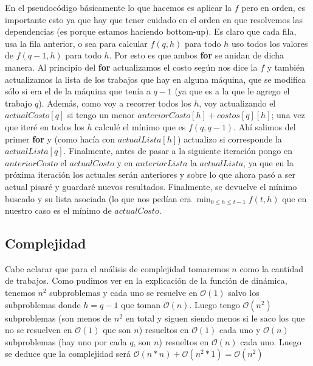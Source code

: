 \documentclass[A4paper,oneside,fleqn,11pt]{article}
\theoremstyle{definition}
\begin{document}
En el pseudocódigo básicamente lo que hacemos es aplicar la $f$ pero en orden, es importante esto ya que hay que tener cuidado en el orden en que resolvemos las dependencias (es porque estamos haciendo bottom-up). Es claro que cada fila, usa la fila anterior, o sea para calcular $f(q,h)$ para todo $h$ uso todos los valores de $f(q-1,h)$ para todo $h$. Por esto es que ambos \textbf{for} se anidan de dicha manera. Al principio del \textbf{for} actualizamos el costo según nos dice la $f$ y también actualizamos la lista de los trabajos que hay en alguna máquina, que se modifica sólo si era el de la máquina que tenía a $q-1$ (ya que es a la que le agrego el trabajo $q$). Además, como voy a recorrer todos los $h$, voy actualizando el $actualCosto[q]$ si tengo un menor $anteriorCosto[h]+costos[q][h]$; una vez que iteré en todos los $h$ calculé el mínimo que es $f(q,q-1)$. Ahí salimos del primer \textbf{for} y (como hacía con $actualLista[h]$) actualizo si corresponde la $actualLista[q]$. Finalmente, antes de pasar a la siguiente iteración pongo en $anteriorCosto$ el $actualCosto$ y en $ anteriorLista$ la $actualLista$, ya que en la próxima iteración los actuales serán anteriores y sobre lo que ahora pasó a ser actual pisaré y guardaré nuevos resultados. Finalmente, se devuelve el mínimo buscado y su lista asociada (lo que nos pedían era $\displaystyle \min_{0 \leq h \leq t-1} {f(t,h)}  $ que en nuestro caso es el mínimo de $actualCosto$.



\subsection{Complejidad}

Cabe aclarar que para el análisis de complejidad tomaremos $n$ como la cantidad de trabajos. Como pudimos ver en la explicación de la función de dinámica, tenemos $n^2$ subproblemas y cada uno se resuelve en  $\mathcal{O}(1)$ salvo los subproblemas donde $ h=q-1$ que toman $\mathcal{O}(n)$. Luego tengo $\mathcal{O}(n^2)$ subproblemas (son menos de $n^2$ en total y siguen siendo menos si le saco los que no se resuelven en $\mathcal{O}(1)$ que son $n$)  resueltos en $\mathcal{O}(1)$ cada uno y $\mathcal{O}(n)$ subproblemas (hay uno por cada $q$, son $n$) resueltos en $\mathcal{O}(n)$ cada uno. Luego se deduce que la complejidad será $\mathcal{O}(n*n)+\mathcal{O}(n^2 *1)=\mathcal{O}(n^2)$
\end{document}
